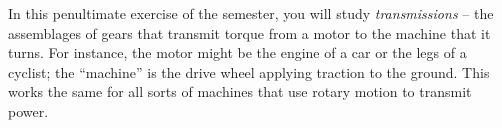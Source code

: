 \documentclass[12pt]{article}
\newcommand{\EI}{\end{itemize}}
\begin{document}
%
%
%


\Large
\centerline{}
\normalsize
\centerline{}

In this penultimate exercise of the semester, you will study {\it transmissions} -- the assemblages of gears that transmit torque from a motor to the machine that it turns. For instance, the motor might be the engine of a car or the legs of a cyclist; the ``machine'' is the drive wheel applying traction to the ground. This works the same for all sorts of machines that use rotary motion to transmit power.
\end{document}
